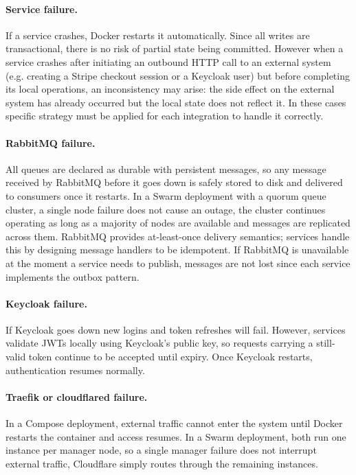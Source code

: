 \paragraph{Service failure.}
If a service crashes, Docker restarts it automatically. Since all writes are transactional, there is no risk of partial state being committed. However when a service crashes after initiating an outbound HTTP call to an external system (e.g. creating a Stripe checkout session or a Keycloak user) but before completing its local operations, an inconsistency may arise: the side effect on the external system has already occurred but the local state does not reflect it. In these cases specific strategy must be applied for each integration to handle it correctly.

\paragraph{RabbitMQ failure.}
All queues are declared as durable with persistent messages, so any message received by RabbitMQ before it goes down is safely stored to disk and delivered to consumers once it restarts. In a Swarm deployment with a quorum queue cluster, a single node failure does not cause an outage, the cluster continues operating as long as a majority of nodes are available and messages are replicated across them. RabbitMQ provides at-least-once delivery semantics; services handle this by designing message handlers to be idempotent. If RabbitMQ is unavailable at the moment a service needs to publish, messages are not lost since each service implements the outbox pattern.

\paragraph{Keycloak failure.}
If Keycloak goes down new logins and token refreshes will fail. However, services validate JWTs locally using Keycloak's public key, so requests carrying a still-valid token continue to be accepted until expiry. Once Keycloak restarts, authentication resumes normally.

\paragraph{Traefik or cloudflared failure.}
In a Compose deployment, external traffic cannot enter the system until Docker restarts the container and access resumes. In a Swarm deployment, both run one instance per manager node, so a single manager failure does not interrupt external traffic, Cloudflare simply routes through the remaining instances.

